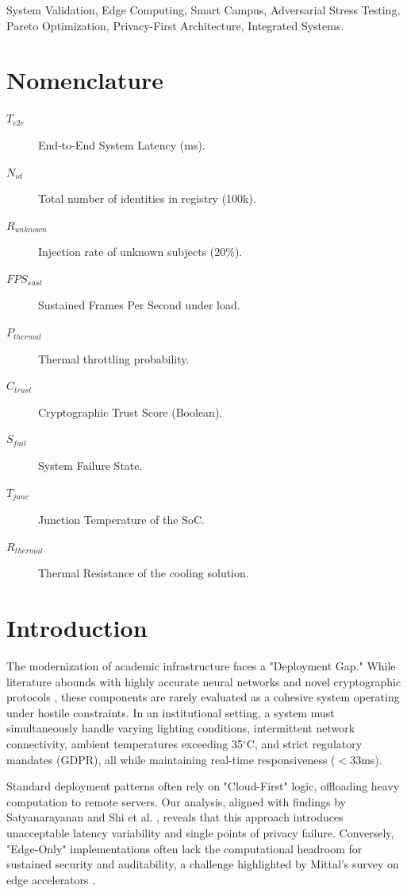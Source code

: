 \documentclass[conference]{IEEEtran}
\begin{document}
\begin{IEEEkeywords}
System Validation, Edge Computing, Smart Campus, Adversarial Stress Testing, Pareto Optimization, Privacy-First Architecture, Integrated Systems.
\end{IEEEkeywords}

\section*{Nomenclature}
\begin{description}
    \item[$T_{e2e}$] End-to-End System Latency (ms).
    \item[$N_{id}$] Total number of identities in registry (100k).
    \item[$R_{unknown}$] Injection rate of unknown subjects (20\%).
    \item[$FPS_{sust}$] Sustained Frames Per Second under load.
    \item[$P_{thermal}$] Thermal throttling probability.
    \item[$C_{trust}$] Cryptographic Trust Score (Boolean).
    \item[$S_{fail}$] System Failure State.
    \item[$T_{junc}$] Junction Temperature of the SoC.
    \item[$R_{thermal}$] Thermal Resistance of the cooling solution.
\end{description}

\section{Introduction}
The modernization of academic infrastructure faces a "Deployment Gap." While literature abounds with highly accurate neural networks \cite{b1, b2} and novel cryptographic protocols \cite{b3}, these components are rarely evaluated as a cohesive system operating under hostile constraints. In an institutional setting, a system must simultaneously handle varying lighting conditions, intermittent network connectivity, ambient temperatures exceeding 35$^\circ$C, and strict regulatory mandates (GDPR), all while maintaining real-time responsiveness ($<33$ms).

Standard deployment patterns often rely on "Cloud-First" logic, offloading heavy computation to remote servers. Our analysis, aligned with findings by Satyanarayanan \cite{b4} and Shi et al. \cite{b5}, reveals that this approach introduces unacceptable latency variability and single points of privacy failure. Conversely, "Edge-Only" implementations often lack the computational headroom for sustained security and auditability, a challenge highlighted by Mittal's survey on edge accelerators \cite{b18}.
\end{document}
